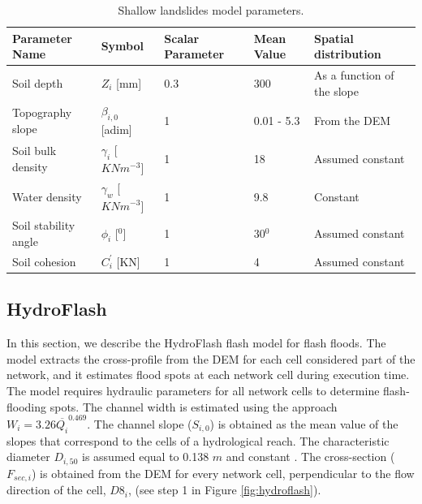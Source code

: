 \documentclass[hess, manuscript]{copernicus}
\begin{document}
\begin{table}[]
        \centering
        \begin{tabularx}{\textwidth}{p{3cm} p{2.2cm} p{1.5cm} p{2cm} p{3.5cm}}
\hline
Parameter Name & Symbol & Scalar Parameter & Mean Value & Spatial distribution \\
\hline
Soil depth & $Z_i$ [mm] & 0.3 & 300 & As a function of the slope \\
Topography slope & $\beta_{i,0}$ [adim] & 1 & 0.01 - 5.3 &  From the DEM \\
Soil bulk density & $\gamma_i$ [$KNm^{-3}$] & 1  & 18  & Assumed constant\\
Water density & $\gamma_w$ [$KNm^{-3}$] & 1 & 9.8 & Constant\\
Soil stability angle & $\phi_i$ [$^0$] & 1 & 30$^0$ & Assumed constant\\
Soil cohesion & $C^{'}_i$ [KN] & 1 & 4 & Assumed constant\\
\hline
\end{tabularx}
\caption{Shallow landslides model parameters.}
\label{tab:landslide}
\end{table}

\subsection{HydroFlash}

In this section, we describe the HydroFlash flash model for flash floods. The model extracts the cross-profile from the DEM for each cell considered part of the network,  and it estimates flood spots at each network cell during execution time.\\

The model requires hydraulic parameters for all network cells to determine flash-flooding spots. The channel width is estimated using the \cite{Leopold1953} approach $ W_i = 3.26 \overline{Q_i}^{0.469}$. The channel slope ($S_{i,0}$) is obtained as the mean value of the slopes that correspond to the cells of a hydrological reach. The characteristic  diameter $D_{i,50}$ is assumed equal to 0.138 $m$ and constant \citep{Golden2006}. The cross-section ($F_{sec,i}$) is obtained from the DEM for every network cell, perpendicular to the flow direction of the cell, $D8_{i}$,  (see step 1 in Figure \ref{fig:hydroflash}).\\
\end{document}

